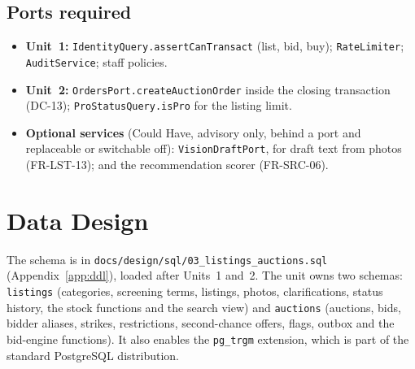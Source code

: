 \documentclass[11pt,a4paper]{article}
\begin{document}
\subsection{Ports required}
\begin{itemize}[nosep]
  \item \textbf{Unit~1:} \texttt{IdentityQuery.assertCanTransact} (list, bid, buy); \texttt{RateLimiter}; \texttt{AuditService}; staff policies.
  \item \textbf{Unit~2:} \texttt{OrdersPort.createAuctionOrder} inside the closing transaction (DC-13); \texttt{ProStatusQuery.isPro} for the listing limit.
  \item \textbf{Optional services} (Could Have, advisory only, behind a port and replaceable or switchable off): \texttt{VisionDraftPort}, for draft text from photos (FR-LST-13); and the recommendation scorer (FR-SRC-06).
\end{itemize}
\section{Data Design}
\label{sec:data}
The schema is in \texttt{docs/design/sql/03\_listings\_auctions.sql} (Appendix~\ref{app:ddl}), loaded after Units~1 and~2. The unit owns two schemas: \texttt{listings} (categories, screening terms, listings, photos, clarifications, status history, the stock functions and the search view) and \texttt{auctions} (auctions, bids, bidder aliases, strikes, restrictions, second-chance offers, flags, outbox and the bid-engine functions). It also enables the \texttt{pg\_trgm} extension, which is part of the standard PostgreSQL distribution.
\end{document}
